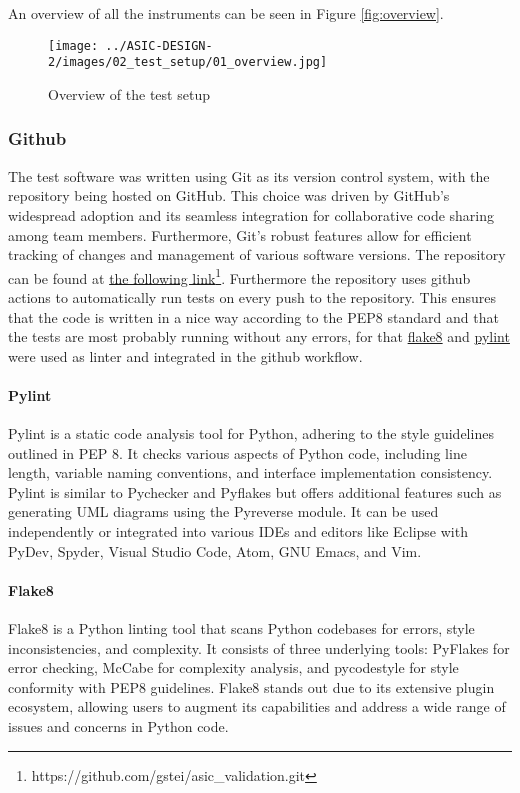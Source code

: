 An overview of all the instruments can be seen in Figure \autoref{fig:overview}.

\begin{figure}[h]
    \centering
    \texttt{[image: ../ASIC-DESIGN-2/images/02\_test\_setup/01\_overview.jpg]}
    \caption{Overview of the test setup}
    \label{fig:overview}
\end{figure}

\subsubsection{Github}
The test software was written using Git as its version control system, with the repository being hosted on GitHub. This choice was driven by GitHub's widespread adoption and its seamless integration for collaborative code sharing among team members. Furthermore, Git's robust features allow for efficient tracking of changes and management of various software versions. The repository can be found at \href{https://github.com/gstei/asic_validation.git}{the following link}\footnote{https://github.com/gstei/asic\_validation.git}. Furthermore the repository uses github actions to automatically run tests on every push to the repository. This ensures that the code is written in a nice way according to the PEP8 standard and that the tests are most probably running without any errors, for that \href{par:Flake8}{flake8} and \href{par:Pylint}{pylint} were used as linter and integrated in the github workflow.

\paragraph{Pylint}
\label{par:Pylint}
Pylint is a static code analysis tool for Python, adhering to the style guidelines outlined in PEP 8. It checks various aspects of Python code, including line length, variable naming conventions, and interface implementation consistency. Pylint is similar to Pychecker and Pyflakes but offers additional features such as generating UML diagrams using the Pyreverse module. It can be used independently or integrated into various IDEs and editors like Eclipse with PyDev, Spyder, Visual Studio Code, Atom, GNU Emacs, and Vim\cite{Wikipedia:Pylint}.

\paragraph{Flake8}
\label{Par:Flake8}
Flake8 is a Python linting tool that scans Python codebases for errors, style inconsistencies, and complexity. It consists of three underlying tools: PyFlakes for error checking, McCabe for complexity analysis, and pycodestyle for style conformity with PEP8 guidelines. Flake8 stands out due to its extensive plugin ecosystem, allowing users to augment its capabilities and address a wide range of issues and concerns in Python code\cite{flake8}.


